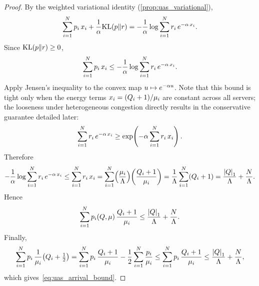 \begin{proof}
By the weighted variational identity (\cref{prop:uas_variational}),
\begin{equation}
\label{eq:uas_var_id}
\sum_{i=1}^{N} p_{i}\, x_{i} + \frac{1}{\alpha}\mathrm{KL}(p\|r)
= -\frac{1}{\alpha}\log \sum_{i=1}^{N} r_{i}\, e^{-\alpha\, x_{i}}.
\end{equation}
Since $\mathrm{KL}(p\|r) \geq 0$,
\begin{equation}
\label{eq:uas_kl_drop}
\sum_{i=1}^{N} p_{i}\, x_{i}
\leq -\frac{1}{\alpha}\log \sum_{i=1}^{N} r_{i}\, e^{-\alpha\, x_{i}}.
\end{equation}
Apply Jensen's inequality to the convex map $u \mapsto e^{-\alpha u}$. Note that this bound is tight only when the energy terms $x_{i} = (Q_{i}+1)/\mu_i$ are constant across all servers; the looseness under heterogeneous congestion directly results in the conservative guarantee detailed later:
\begin{equation}
\label{eq:uas_jensen}
\sum_{i=1}^{N} r_{i}\, e^{-\alpha\, x_{i}}
\geq \exp\!\left(-\alpha \sum_{i=1}^{N} r_{i}\, x_{i}\right).
\end{equation}
Therefore
\begin{equation}
\label{eq:uas_jensen_result}
-\frac{1}{\alpha}\log \sum_{i=1}^{N} r_{i}\, e^{-\alpha\, x_{i}}
\leq \sum_{i=1}^{N} r_{i}\, x_{i}
= \sum_{i=1}^{N} \!\left(\frac{\mu_i}{\Lambda}\right) \!\left(\frac{Q_{i}+1}{\mu_i}\right)
= \frac{1}{\Lambda}\sum_{i=1}^{N} (Q_{i}+1)
= \frac{\left\lvert Q \right\rvert_1}{\Lambda} + \frac{N}{\Lambda}.
\end{equation}
Hence
\begin{equation}
\label{eq:uas_x_bound}
\sum_{i=1}^{N} p_{i}(Q, \mu)\,\frac{Q_{i}+1}{\mu_i} \leq \frac{\left\lvert Q \right\rvert_1}{\Lambda} + \frac{N}{\Lambda}.
\end{equation}
Finally,
\begin{equation}
\label{eq:uas_half_bound}
\sum_{i=1}^{N} p_{i}\,\frac{1}{\mu_i}\bigl(Q_{i}+\tfrac{1}{2}\bigr)
= \sum_{i=1}^{N} p_{i}\,\frac{Q_{i}+1}{\mu_i}
- \frac{1}{2}\sum_{i=1}^{N} \frac{p_{i}}{\mu_i}
\leq \sum_{i=1}^{N} p_{i}\,\frac{Q_{i}+1}{\mu_i}
\leq \frac{\left\lvert Q \right\rvert_1}{\Lambda} + \frac{N}{\Lambda},
\end{equation}
which gives~\eqref{eq:uas_arrival_bound}.
\end{proof}

